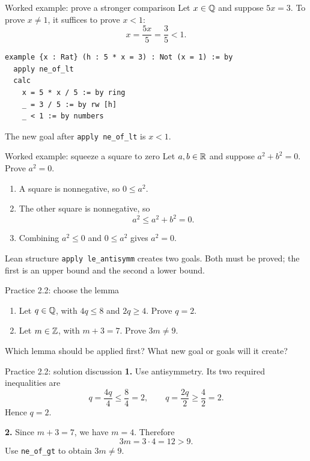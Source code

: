 \begin{frame}[fragile]{Worked example: prove a stronger comparison}
Let $x\in\mathbb{Q}$ and suppose $5x=3$. To prove $x\ne1$, it suffices to prove $x<1$:
\[
x=\frac{5x}{5}=\frac35<1.
\]
\begin{lstlisting}
example {x : Rat} (h : 5 * x = 3) : Not (x = 1) := by
  apply ne_of_lt
  calc
    x = 5 * x / 5 := by ring
    _ = 3 / 5 := by rw [h]
    _ < 1 := by numbers
\end{lstlisting}
The new goal after \texttt{apply ne\_of\_lt} is $x<1$.
\end{frame}

\begin{frame}{Worked example: squeeze a square to zero}
Let $a,b\in\mathbb{R}$ and suppose $a^2+b^2=0$. Prove $a^2=0$.
\begin{enumerate}
\item A square is nonnegative, so $0\le a^2$.
\item The other square is nonnegative, so
\[
a^2\le a^2+b^2=0.
\]
\item Combining $a^2\le0$ and $0\le a^2$ gives $a^2=0$.
\end{enumerate}
\begin{block}{Lean structure}
\texttt{apply le\_antisymm} creates two goals.
Both must be proved; the first is an upper bound and the second a lower bound.
\end{block}
\end{frame}

\begin{frame}{Practice 2.2: choose the lemma}
\begin{enumerate}
\item Let $q\in\mathbb{Q}$, with $4q\le8$ and $2q\ge4$. Prove $q=2$.
\item Let $m\in\mathbb{Z}$, with $m+3=7$. Prove $3m\ne9$.
\end{enumerate}
\vspace{1em}
Which lemma should be applied first? What new goal or goals will it create?
\end{frame}

\begin{frame}{Practice 2.2: solution discussion}
\textbf{1.} Use antisymmetry. Its two required inequalities are
\[
q=\frac{4q}{4}\le\frac84=2,
\qquad
q=\frac{2q}{2}\ge\frac42=2.
\]
Hence $q=2$.
\medskip

\textbf{2.} Since $m+3=7$, we have $m=4$. Therefore
\[
3m=3\cdot4=12>9.
\]
Use \texttt{ne\_of\_gt} to obtain $3m\ne9$.
\end{frame}

